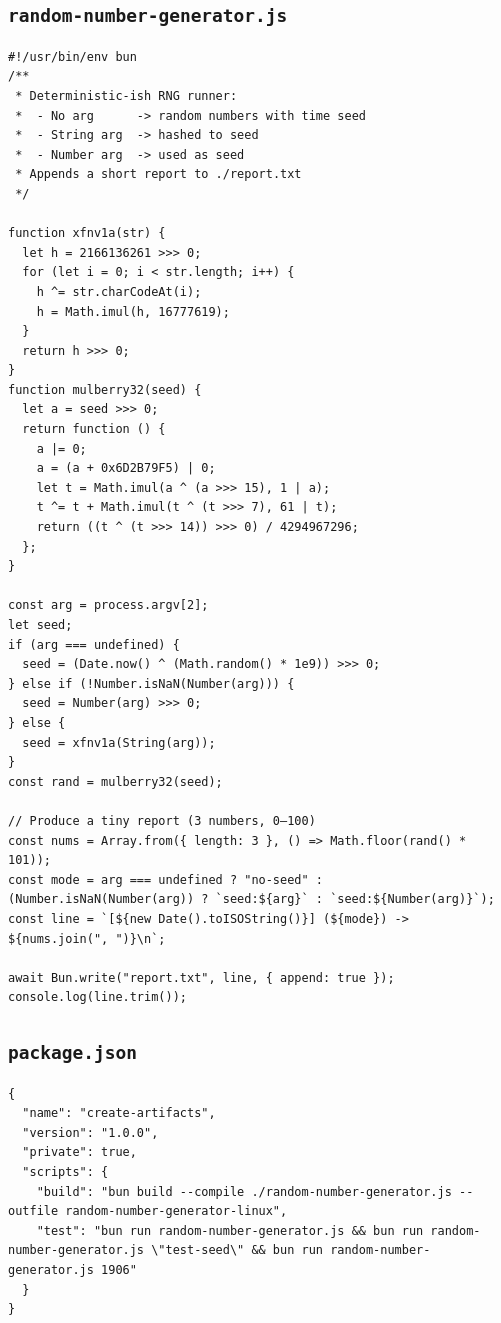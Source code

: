 \documentclass[11pt]{article}
\begin{document}
\subsection{\texttt{random-number-generator.js}}
\begin{verbatim}
#!/usr/bin/env bun
/**
 * Deterministic-ish RNG runner:
 *  - No arg      -> random numbers with time seed
 *  - String arg  -> hashed to seed
 *  - Number arg  -> used as seed
 * Appends a short report to ./report.txt
 */

function xfnv1a(str) {
  let h = 2166136261 >>> 0;
  for (let i = 0; i < str.length; i++) {
    h ^= str.charCodeAt(i);
    h = Math.imul(h, 16777619);
  }
  return h >>> 0;
}
function mulberry32(seed) {
  let a = seed >>> 0;
  return function () {
    a |= 0;
    a = (a + 0x6D2B79F5) | 0;
    let t = Math.imul(a ^ (a >>> 15), 1 | a);
    t ^= t + Math.imul(t ^ (t >>> 7), 61 | t);
    return ((t ^ (t >>> 14)) >>> 0) / 4294967296;
  };
}

const arg = process.argv[2];
let seed;
if (arg === undefined) {
  seed = (Date.now() ^ (Math.random() * 1e9)) >>> 0;
} else if (!Number.isNaN(Number(arg))) {
  seed = Number(arg) >>> 0;
} else {
  seed = xfnv1a(String(arg));
}
const rand = mulberry32(seed);

// Produce a tiny report (3 numbers, 0–100)
const nums = Array.from({ length: 3 }, () => Math.floor(rand() * 101));
const mode = arg === undefined ? "no-seed" : (Number.isNaN(Number(arg)) ? `seed:${arg}` : `seed:${Number(arg)}`);
const line = `[${new Date().toISOString()}] (${mode}) -> ${nums.join(", ")}\n`;

await Bun.write("report.txt", line, { append: true });
console.log(line.trim());
\end{verbatim}
\clearpage

\subsection{\texttt{package.json}}
\begin{verbatim}
{
  "name": "create-artifacts",
  "version": "1.0.0",
  "private": true,
  "scripts": {
    "build": "bun build --compile ./random-number-generator.js --outfile random-number-generator-linux",
    "test": "bun run random-number-generator.js && bun run random-number-generator.js \"test-seed\" && bun run random-number-generator.js 1906"
  }
}
\end{verbatim}
\end{document}
